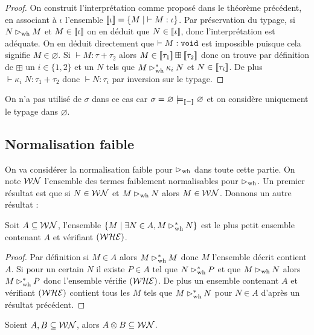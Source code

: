 \begin{proof}
    On construit l'interprétation comme proposé dans le théorème précédent, en associant à $\iota$ l'ensemble $[\![ \iota ]\!] = \{ M \mid \;\vdash M : \iota\}$. Par préservation du typage, si $N\rhd_{\mathrm{wh}} M$ et $M\in[\![ \iota ]\!]$ on en déduit que $N\in[\![ \iota ]\!]$, donc l'interprétation est adéquate. On en déduit directement que $\vdash M : \texttt{void}$ est impossible puisque cela signifie $M\in\varnothing$. Si $\vdash M : \tau+\tau_2$ alors $M\in [\![ \tau_1 ]\!]\boxplus[\![ \tau_2 ]\!]$ donc on trouve par définition de $\boxplus$ un $i\in\{1,2\}$ et un $N$ tels que $M\rhd_{\mathrm{wh}}^* \kappa_i\;N$ et $N\in[\![ \tau_i ]\!]$. De plus $\vdash \kappa_i\;N : \tau_1+\tau_2$ donc $\vdash N : \tau_i$ par inversion sur le typage.
\end{proof}

\begin{rmk}
    On n'a pas utilisé de $\sigma$ dans ce cas car $\sigma = \varnothing\models_{[\![ - ]\!]}\varnothing$ et on considère uniquement le typage dans $\varnothing$. 
\end{rmk}

\subsection{Normalisation faible}

On va considérer la normalisation faible pour $\rhd_{\mathrm{wh}}$ dans toute cette partie. On note $\mathcal {WN}$ l'ensemble des termes faiblement normalisables pour $\rhd_{\mathrm{wh}}$. Un premier résultat est que si $N\in\mathcal {WN}$ et $M\rhd_{\mathrm{wh}} N$ alors $M\in\mathcal {WN}$. Donnons un autre résultat :

\begin{lem}
    Soit $A\subseteq \mathcal {WN}$, l'ensemble $\{M\mid \exists N \in A, M\rhd_{\mathrm{wh}}^* N\}$ est le plus petit ensemble contenant $A$ et vérifiant $(\mathcal {WHE})$.
\end{lem}

\begin{proof}
    Par définition si $M\in A$ alors $M\rhd_{\mathrm{wh}}^* M$ donc $M$ l'ensemble décrit contient $A$. Si pour un certain $N$ il existe $P\in A$ tel que $N\rhd_{\mathrm{wh}}^* P$ et que $M\rhd_{\mathrm{wh}} N$ alors $M\rhd_{\mathrm{wh}}^* P$ donc l'ensemble vérifie $(\mathcal {WHE})$. De plus un ensemble contenant $A$ et vérifiant $(\mathcal {WHE})$ contient tous les $M$ tels que $M\rhd_{\mathrm{wh}}^* N$ pour $N\in A$ d'après un résultat précédent.
\end{proof}

\begin{lem}
    Soient $A,B\subseteq\mathcal {WN}$, alors $A\otimes B\subseteq \mathcal {WN}$.
\end{lem}

